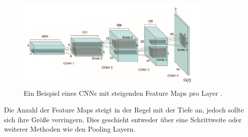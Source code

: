 \documentclass[11pt,bibliography=totocnumbered]{scrartcl}
\begin{document}
\begin{figure}[H]
	\centering
	\includegraphics[width=0.85\textwidth]{cnn_3d}
	\vspace*{-3mm}
	\caption[Beispiel eines CNNs mit mehreren Feature Maps]{Ein Beispiel eines CNNs mit steigenden Feature Maps pro Layer \cite[S.138]{DEEP_LEARNING_REVOLUTION}.}
	\label{fig:cnn_3d}
\end{figure}
\vspace*{-5mm}
Die Anzahl der Feature Maps steigt in der Regel mit der Tiefe an, jedoch sollte sich ihre Größe verringern. Dies geschieht entweder über eine Schrittweite oder weiterer Methoden wie den Pooling Layern.
\end{document}
